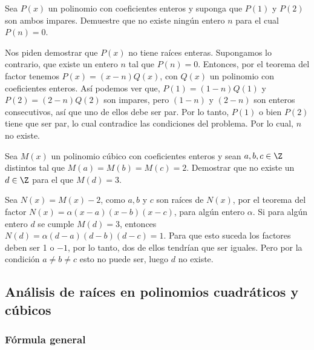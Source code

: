 \begin{example}
    Sea $P(x)$ un polinomio con coeficientes enteros y suponga que $P(1)$ y $P(2)$ son ambos impares.
    Demuestre que no existe ningún entero $n$ para el cual $P(n) = 0$.
\end{example}
\begin{solution}
    Nos piden demostrar que $P(x)$ no tiene raíces enteras.
    Supongamos lo contrario, que existe un entero $n$ tal que $P(n) = 0$.
    Entonces, por el teorema del factor tenemos $P(x) = (x - n)Q(x)$, con $Q(x)$ un polinomio con coeficientes enteros.
    Así podemos ver que, $P(1) = (1 - n)Q(1)$ y $P(2) = (2 - n)Q(2)$ son impares, pero $(1 - n)$ y $(2 - n)$ son enteros consecutivos, así que uno de ellos debe ser par.
    Por lo tanto, $P(1)$ o bien $P(2)$ tiene que ser par, lo cual contradice las condiciones del problema.
    Por lo cual, $n$ no existe.
\end{solution}

\begin{example}
    Sea $M(x)$ un polinomio cúbico con coeficientes enteros y sean $a, b, c \in \Z$ distintos tal que $M(a) = M(b) = M(c) = 2$.
    Demostrar que no existe un $d \in \Z$ para el que $M(d) = 3.$
\end{example}
\begin{solution}
    Sea $N(x) = M(x) - 2$, como $a, b$ y $c$ son raíces de $N(x)$, por el teorema del factor $N(x) = \alpha (x - a)(x - b)(x - c)$, para algún entero $\alpha$.
    Si para algún entero $d$ se cumple $M(d) = 3$, entonces $N(d) = \alpha (d - a)(d - b)(d - c) = 1$.
    Para que esto suceda los factores deben ser 1 o $-1$, por lo tanto, dos de ellos tendrían que ser iguales.
    Pero por la condición $a \neq b \neq c$ esto no puede ser, luego $d$ no existe.
\end{solution}



\subsection{Análisis de raíces en polinomios cuadráticos y cúbicos}

\subsubsection{Fórmula general}


